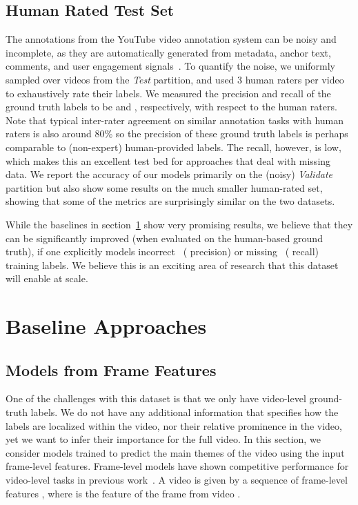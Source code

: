 \documentclass{sig-alternate-05-2015}
\begin{document}
\subsection{Human Rated Test Set}
\label{sec:humangt}
The annotations from the YouTube video annotation system can be noisy and incomplete, as they are automatically
generated from metadata, anchor text, comments, and user engagement signals~\cite{youtube-legos}.
To quantify the noise, we uniformly sampled over  videos from
the {\it Test} partition, and used 3 human raters per video to exhaustively rate their labels.
We measured the precision and recall of the ground truth labels to be  and ,
respectively, with respect to the human raters. Note that typical inter-rater agreement
on similar annotation tasks with human raters is also around 80\% so the precision of
these ground truth labels is perhaps comparable to (non-expert) human-provided labels.
The recall, however, is low, which makes this an excellent test bed for approaches
that deal with missing data.  We report the accuracy of our models primarily on the
(noisy) {\it Validate} partition but also show some results on the much smaller human-rated set,
showing that some of the metrics are surprisingly similar on the two datasets.

While the baselines in section~\ref{sec:benchmarks} show very promising results, we believe
that they can be significantly improved (when evaluated on the human-based ground truth),
if one explicitly models incorrect~\cite{reed2014noisy} ( precision)
or missing~\cite{missinglabels, noisydata} ( recall) training labels.
We believe this is an exciting area of research that this dataset will enable at scale.
 
\section{Baseline Approaches}
\label{sec:benchmarks}


\subsection{Models from Frame Features}
\label{sec:frame_level_models}
One of the challenges with this dataset is that we only have video-level
ground-truth labels. We do not have any additional information that specifies how
the labels are localized within the video, nor their relative prominence in the
video, yet we want to infer their importance for the full video. In this section, we
consider models trained to predict the main themes of the video using the input
frame-level features. Frame-level models have shown competitive performance for
video-level tasks in previous work~\cite{karpathy2014large,beyond}. A
video  is given by a sequence of frame-level features ,
where  is the feature of the  frame from video .
\end{document}
